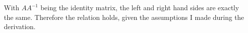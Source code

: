 With $A A^{-1}$ being the identity matrix, the left and right hand sides are
exactly the same. Therefore the relation holds, given the assumptions I made
during the derivation.

\IfFileExists{\bibliographyfile}{
    \printbibliography
}{}




